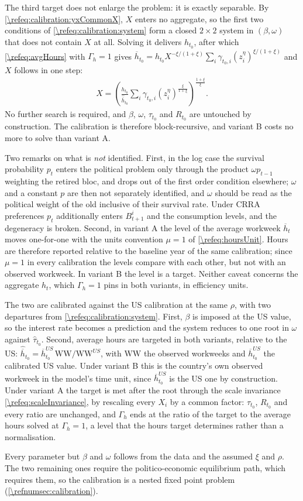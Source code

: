 The third target does not enlarge the problem: it is exactly separable. By \eqref{\refeq:calibration:yxCommonX}, $X$ enters no aggregate, so the first two conditions of \eqref{\refeq:calibration:system} form a closed $2\times2$ system in $(\beta,\omega)$ that does not contain $X$ at all. Solving it delivers $h_{t_0}$, after which \eqref{\refeq:avgHours} with $\Gamma_h = 1$ gives $\overline{h}_{t_0} = h_{t_0}X^{-\xi/(1+\xi)}\sum_i\gamma_{t_0,i}(z_i^{\eta})^{\xi/(1+\xi)}$ and $X$ follows in one step:
\begin{align}\label{\refeq:calibration:Xsolve}
    X = \left(\frac{h_{t_0}}{\hat{\overline{h}}_{t_0}}\sum_i\gamma_{t_0,i}\left(z_i^{\eta}\right)^{\frac{\xi}{1+\xi}}\right)^{\frac{1+\xi}{\xi}}.
\end{align}
No further search is required, and $\beta$, $\omega$, $\tau_{t_0}$ and $R_{t_0}$ are untouched by construction. The calibration is therefore block-recursive, and variant B costs no more to solve than variant A.

Two remarks on what is \emph{not} identified. First, in the log case the survival probability $p_t$ enters the political problem only through the product $\omega p_{t-1}$ weighting the retired bloc, and drops out of the first order condition elsewhere; $\omega$ and a constant $p$ are then not separately identified, and $\omega$ should be read as the political weight of the old inclusive of their survival rate. Under CRRA preferences $p_t$ additionally enters $B_{t+1}^i$ and the consumption levels, and the degeneracy is broken. Second, in variant A the level of the average workweek $\overline{h}_t$ moves one-for-one with the units convention $\mu = 1$ of \eqref{\refeq:hoursUnit}. Hours are therefore reported relative to the baseline year of the same calibration; since $\mu = 1$ in every calibration the levels compare with each other, but not with an observed workweek. In variant B the level is a target. Neither caveat concerns the aggregate $h_t$, which $\Gamma_h = 1$ pins in both variants, in efficiency units.

 The two are calibrated against the US calibration at the same $\rho$, with two departures from \eqref{\refeq:calibration:system}. First, $\beta$ is imposed at the US value, so the interest rate becomes a prediction and the system reduces to one root in $\omega$ against $\hat{\tau}_{t_0}$. Second, average hours are targeted in both variants, relative to the US: $\hat{\overline{h}}_{t_0} = \overline{h}_{t_0}^{US}\,\mathrm{WW}/\mathrm{WW}^{US}$, with $\mathrm{WW}$ the observed workweeks and $\overline{h}_{t_0}^{US}$ the calibrated US value. Under variant B this is the country's own observed workweek in the model's time unit, since $\overline{h}_{t_0}^{US}$ is the US one by construction. Under variant A the target is met after the root through the scale invariance \eqref{\refeq:scaleInvariance}, by rescaling every $X_i$ by a common factor: $\tau_{t_0}$, $R_{t_0}$ and every ratio are unchanged, and $\Gamma_h$ ends at the ratio of the target to the average hours solved at $\Gamma_h = 1$, a level that the hours target determines rather than a normalisation.

Every parameter but $\beta$ and $\omega$ follows from the data and the assumed $\xi$ and $\rho$. The two remaining ones require the politico-economic equilibrium path, which requires them, so the calibration is a nested fixed point problem (\cref{\refnumsec:calibration}).
